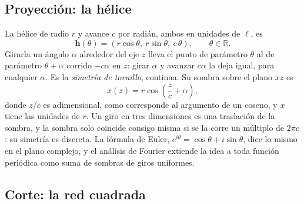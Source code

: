 \documentclass[11pt,a4paper]{article}
\begin{document}
\subsection{Proyección: la hélice}

La hélice de radio $r$ y avance $c$ por radián, ambos en unidades de $\ell$, es
\begin{equation}\label{eq:helice}
\mathbf h(\theta) = (r\cos\theta,\ r\sin\theta,\ c\,\theta), \qquad \theta \in \mathbb R .
\end{equation}
Girarla un ángulo $\alpha$ alrededor del eje $z$ lleva el punto de parámetro $\theta$ al de parámetro $\theta + \alpha$ corrido $-c\alpha$ en $z$: girar $\alpha$ y avanzar $c\alpha$ la deja igual, para cualquier $\alpha$. Es la \emph{simetría de tornillo}, continua. Su sombra sobre el plano $xz$ es
\begin{equation}\label{eq:sombra}
x(z) = r\cos\!\left(\frac{z}{c} + \alpha\right),
\end{equation}
donde $z/c$ es adimensional, como corresponde al argumento de un coseno, y $x$ tiene las unidades de $r$. Un giro en tres dimensiones es una traslación de la sombra, y la sombra solo coincide consigo misma si se la corre un múltiplo de $2\pi c$: su simetría es discreta. La fórmula de Euler, $e^{i\theta} = \cos\theta + i\sin\theta$, dice lo mismo en el plano complejo, y el análisis de Fourier extiende la idea a toda función periódica como suma de sombras de giros uniformes.

\subsection{Corte: la red cuadrada}
\end{document}
